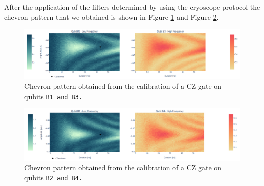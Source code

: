 After the application of the filters determined by using the cryoscope protocol the chevron pattern that we obtained is shown in Figure \ref{fig:B1B3} and Figure \ref{fig:B2B4}.

\begin{figure}[h!]
    \centering
    \includegraphics[width=\textwidth]{figures/png/Cryoscope/B1B3.png}
    \caption{Chevron pattern obtained from the calibration of a CZ gate on qubits \tt{B1} and \tt{B3}.}
    \label{fig:B1B3}
\end{figure}

\begin{figure}[h!]
    \centering
    \includegraphics[width=\textwidth]{figures/png/Cryoscope/B2B4.png}
    \caption{Chevron pattern obtained from the calibration of a CZ gate on qubits \tt{B2} and \tt{B4}.}
    \label{fig:B2B4}
\end{figure}

\newpage
\restoregeometry
